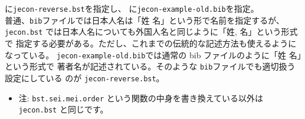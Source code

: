 \documentclass[article]{jlreq}
\begin{document}
\verb||に\verb|jecon-reverse.bst|を指定し、
\verb||に\verb|jecon-example-old.bib|を指定。
\vspace{1em}\\

普通、\verb|bib|ファイルでは日本人名は「姓 名」という形で名前を指定するが、
\verb|jecon.bst| では日本人名についても外国人名と同じように「姓, 名」という形式で
指定する必要がある。ただし、これまでの伝統的な記述方法も使えるようになっている。
\verb|jecon-example-old.bib|では通常の bib ファイルのように「姓 名」という形式で
著者名が記述されている。そのような \verb|bib|ファイルでも適切扱う設定にしている
のが \verb|jecon-reverse.bst|。
\begin{itemize}
 \item 注: \verb|bst.sei.mei.order| という関数の中身を書き換えている以外は
       \verb|jecon.bst| と同じです。
\end{itemize}

\vspace{2em}



\nocite{*}


% 

%

\end{document}
